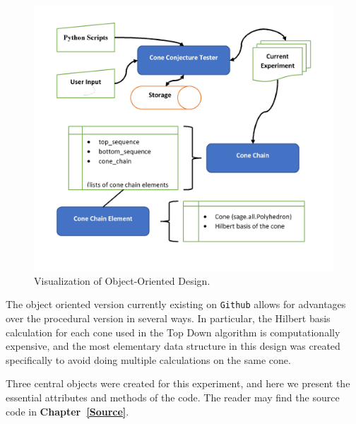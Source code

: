 \documentclass{TC}
\begin{document}
\begin{figure}[h]
\centering
\includegraphics[width=.75\textwidth]{"Data Structure Picture"}
\caption{Visualization of Object-Oriented Design.}
\end{figure}
The object oriented version currently existing on \texttt{Github} allows for advantages over the procedural version in several ways. In particular, the Hilbert basis calculation for each cone used in the Top Down algorithm is computationally expensive, and the most elementary data structure in this design was created specifically to avoid doing multiple calculations on the same cone. 

Three central objects were created for this experiment, and here we present the essential attributes and methods of the code. The reader may find the source code in \textbf{Chapter~\ref{Source}}.
\end{document}
